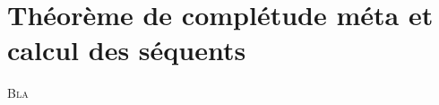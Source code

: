 \chapter[Calcul des séquents]{Théorème de complétude méta et
  calcul des séquents}\label{chp.sequents}

\minitoc

\lettrine{B}{la}
